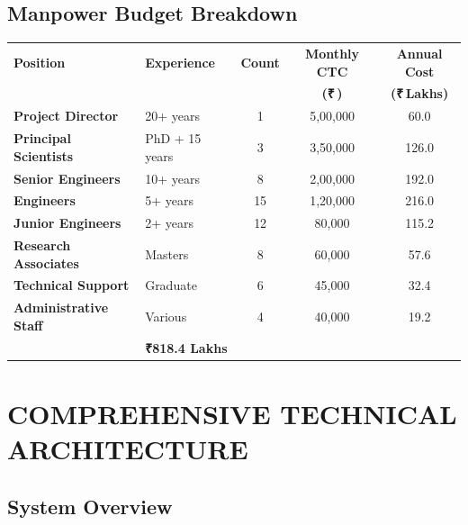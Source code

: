 \documentclass[12pt,a4paper]{article}
\newcommand{\rupees}{₹\,}
\begin{document}
\subsection{Manpower Budget Breakdown}

\begin{longtable}{|p{4cm}|p{3cm}|c|c|c|}
\hline
\rowcolor{lightblue}
\textbf{Position} & \textbf{Experience} & \textbf{Count} & \textbf{Monthly CTC} & \textbf{Annual Cost} \\
& & & \textbf{(\rupees)} & \textbf{(\rupees Lakhs)} \\
\hline
\endhead

\textbf{Project Director} & 20+ years & 1 & 5,00,000 & 60.0 \\
\hline

\textbf{Principal Scientists} & PhD + 15 years & 3 & 3,50,000 & 126.0 \\
\hline

\textbf{Senior Engineers} & 10+ years & 8 & 2,00,000 & 192.0 \\
\hline

\textbf{Engineers} & 5+ years & 15 & 1,20,000 & 216.0 \\
\hline

\textbf{Junior Engineers} & 2+ years & 12 & 80,000 & 115.2 \\
\hline

\textbf{Research Associates} & Masters & 8 & 60,000 & 57.6 \\
\hline

\textbf{Technical Support} & Graduate & 6 & 45,000 & 32.4 \\
\hline

\textbf{Administrative Staff} & Various & 4 & 40,000 & 19.2 \\
\hline

\rowcolor{yellow}
\multicolumn{4}{|c|}{\textbf{TOTAL MANPOWER (3 YEARS)}} & \textbf{₹818.4 Lakhs} \\
\hline

\end{longtable}

\newpage

\section{COMPREHENSIVE TECHNICAL ARCHITECTURE}

\subsection{System Overview}
\end{document}
